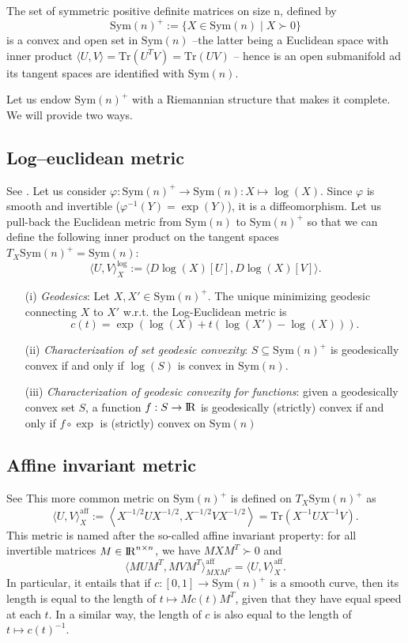\documentclass[10pt,a4paper]{book}
\theoremstyle{definition}
\theoremstyle{plain}
\theoremstyle{remark}
\newcommand \SPD {\text{Sym}(n)^{+}}
\def\R{{\rm I\kern-0.16em R}}
\begin{document}
The set of symmetric positive definite matrices on size n, defined by
$$\text{Sym}(n)^{+}:=\{X\in \text{Sym}(n) \mid X\succ 0\}$$
is a convex and open set in $\text{Sym}(n)$ --the latter being a Euclidean space with inner product $\langle U,V \rangle =\text{Tr}(U^{T}V)=\text{Tr}(UV)$ -- hence is an open submanifold ad its tangent spaces are identified with $\text{Sym}(n)$. 

Let us endow $\SPD$ with a Riemannian structure that makes it complete. We will provide two ways. 
\subsection{Log--euclidean metric}
See \cite{arsigny2007geometric}.
Let us consider $\varphi: \SPD \to \text{Sym}(n): X\mapsto \log(X)$. Since $\varphi$ is smooth and invertible ($\varphi^{-1}(Y)=\exp(Y)$), it is a diffeomorphism. Let us pull-back the Euclidean metric from $\text{Sym}(n)$ to $\SPD$ so that we can define the following inner product on the tangent spaces $T_X\SPD=\text{Sym}(n)$:
$$\langle U,V\rangle_X^{\log}:=\langle D\log(X)[U],D\log(X)[V]\rangle.$$
\begin{itemize}
\item[(i)] \textit{Geodesics}: Let $X,X'\in \SPD$. The unique minimizing geodesic connecting $X$ to $X'$ w.r.t. the Log-Euclidean metric is
$$c(t)=\exp(\log(X)+t(\log(X')-\log(X))).$$
\item[(ii)] \textit{Characterization of set geodesic convexity}: $S\subseteq \SPD$ is geodesically convex if and only if $\log(S)$ is convex in $\text{Sym}(n)$.
\item[(iii)] \textit{Characterization of geodesic convexity for functions}: given a geodesically convex set $S$, a function $f:S\to \R$ is geodesically (strictly) convex if and only if $f\circ \exp$ is (strictly) convex on $\text{Sym}(n)$
\end{itemize}
\subsection{Affine invariant metric} See \cite{pennec2006riemannian}This more common metric on $\SPD$ is defined on $T_X\SPD$ as
$$\langle U,V\rangle_X^{\text{aff}}:=\left\langle X^{-1/2}UX^{-1/2},X^{-1/2}VX^{-1/2}\right \rangle=\text{Tr}(X^{-1}UX^{-1}V).$$
This metric is named after the so-called affine invariant property: for all invertible matrices $M\in \R^{n\times n}$, we have $MXM^{T}\succ 0$ and
$$\langle MUM^{T},MVM^{T}\rangle_{MXM^T}^{\text{aff}}=\langle U,V\rangle_X^{\text{aff}}.$$
In particular, it entails that if $c:[0,1]\to \SPD$ is a smooth curve, then its length is equal to the length of $t\mapsto Mc(t)M^{T}$, given that they have equal speed at each $t$. In a similar way, the length of $c$ is also equal to the length of $t\mapsto c(t)^{-1}$.
\end{document}
